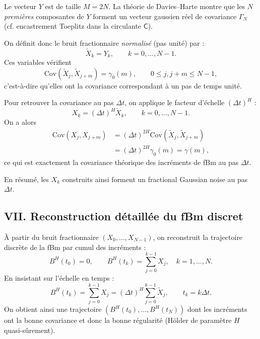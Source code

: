 \documentclass[11pt,a4paper]{article}
\newcommand{\Cov}{\mathrm{Cov}}
\newcommand{\1}{\mathbf{1}}
\newcommand{\bH}{B^{H}}
\begin{document}
Le vecteur $Y$ est de taille $M=2N$. La théorie de Davies--Harte montre
que les $N$ \emph{premières} composantes de $Y$ forment un vecteur
gaussien réel de covariance $\Gamma_N$ (cf. encastrement Toeplitz
dans la circulante $\mathsf{C}$).

On définit donc le bruit fractionnaire \emph{normalisé} (pas unité)
par :
\begin{equation}
  \label{eq:def-fGn-unit}
  \tilde{X}_k = Y_k,
  \qquad k=0,\dots,N-1.
\end{equation}
Ces variables vérifient
\begin{equation}
  \Cov(\tilde{X}_j,\tilde{X}_{j+m})
  = \gamma_0(m),
  \qquad 0\le j, j+m \le N-1,
\end{equation}
c'est-à-dire qu'elles ont la covariance correspondant à un pas de
temps unité.

Pour retrouver la covariance au pas $\Delta t$, on applique le
facteur d'échelle $(\Delta t)^H$ :
\begin{equation}
  X_k = (\Delta t)^H \tilde{X}_k,
  \qquad k=0,\dots,N-1.
\end{equation}
On a alors
\begin{align}
  \Cov(X_j,X_{j+m})
  &= (\Delta t)^{2H}\Cov(\tilde{X}_j,\tilde{X}_{j+m}) \\
  &= (\Delta t)^{2H}\gamma_0(m)
   = \gamma(m),
\end{align}
ce qui est exactement la covariance théorique des incréments de fBm
au pas $\Delta t$.

En résumé, les $X_k$ construits ainsi forment un fractional
Gaussian noise au pas $\Delta t$.

\subsection*{VII. Reconstruction détaillée du fBm discret}

À partir du bruit fractionnaire $(X_0,\dots,X_{N-1})$, on reconstruit
la trajectoire discrète de la fBm par cumul des incréments :
\begin{equation}
  \bH(t_0) = 0,
  \qquad
  \bH(t_k) = \sum_{j=0}^{k-1} X_j,
  \quad k=1,\dots,N.
\end{equation}
En insistant sur l'échelle en temps :
\begin{equation}
  \bH(t_k)
  = \sum_{j=0}^{k-1} X_j
  = (\Delta t)^H \sum_{j=0}^{k-1} \tilde{X}_j,
  \qquad t_k = k\Delta t.
\end{equation}
On obtient ainsi une trajectoire
$(\bH(t_0),\dots,\bH(t_N))$ dont les incréments ont la bonne
covariance et donc la bonne régularité (Hölder de paramètre $H$
quasi-sûrement).
\end{document}
